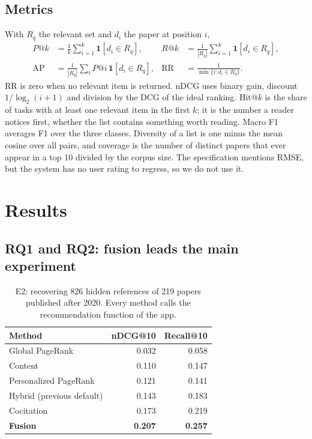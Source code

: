 \documentclass[11pt,a4paper]{article}
\begin{document}
\subsection{Metrics}
With $R_q$ the relevant set and $d_i$ the paper at position $i$,
\begin{align}
P@k &= \frac{1}{k}\sum_{i=1}^{k}\mathbf{1}[d_i\in R_q], &
R@k &= \frac{1}{|R_q|}\sum_{i=1}^{k}\mathbf{1}[d_i\in R_q],\\
\mathrm{AP} &= \frac{1}{|R_q|}\sum_i P@i\,\mathbf{1}[d_i\in R_q], &
\mathrm{RR} &= \frac{1}{\min\{i:d_i\in R_q\}}.
\end{align}
RR is zero when no relevant item is returned. nDCG uses binary gain, discount $1/\log_2(i+1)$ and division by the DCG of the ideal ranking. Hit@$k$ is the share of tasks with at least one relevant item in the first $k$; it is the number a reader notices first, whether the list contains something worth reading. Macro F1 averages F1 over the three classes. Diversity of a list is one minus the mean cosine over all pairs, and coverage is the number of distinct papers that ever appear in a top 10 divided by the corpus size. The specification mentions RMSE, but the system has no user rating to regress, so we do not use it.

\section{Results}\label{sec:results}
\subsection{RQ1 and RQ2: fusion leads the main experiment}
\begin{table}[htbp]\centering
\begin{tabular}{@{}lrr@{}}\toprule
Method & nDCG@10 & Recall@10\\\midrule
Global PageRank & 0.032 & 0.058\\
Content & 0.110 & 0.147\\
Personalized PageRank & 0.121 & 0.141\\
Hybrid (previous default) & 0.143 & 0.183\\
Cocitation & 0.173 & 0.219\\
\textbf{Fusion} & \textbf{0.207} & \textbf{0.257}\\\bottomrule
\end{tabular}\caption{E2: recovering 826 hidden references of 219 papers published after 2020. Every method calls the recommendation function of the app.}\label{tab:temporal}\end{table}
\end{document}
